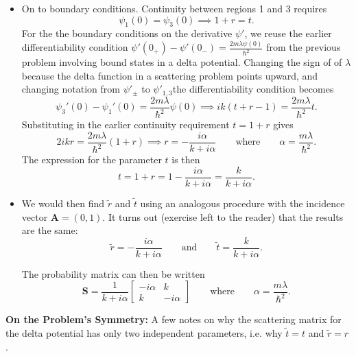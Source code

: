 \documentclass[11pt, a4paper]{article}
\newcommand{\eqtext}[1]{\qquad \text{#1} \qquad}
\renewcommand{\vec}[1]{\bm{#1}} %
\newcommand{\mat}[1]{\mathbf{#1}} %
\begin{document}
\begin{itemize}
	\item On to boundary conditions. Continuity between regions 1 and 3 requires
	\begin{equation*}
		\psi_{1}(0) = \psi_{3}(0) \implies 1 + r = t.
	\end{equation*} 
	For the the boundary conditions on the derivative $ \psi' $, we reuse the earlier differentiability condition $ \psi'(0_{+}) - \psi'(0_{-}) = \frac{2m\lambda\psi(0)}{\hbar^{2}} $ from the previous problem involving bound states in a delta potential. Changing the sign of of $ \lambda $ because the delta function in a scattering problem points upward, and changing notation from $ \psi'_{\pm} $ to $ \psi'_{1,3} $the differentiability condition becomes
	\begin{equation*}
		\psi_{3}'(0) - \psi_{1}'(0) = \frac{2m\lambda}{\hbar^{2}} \psi(0) \implies ik(t + r -1) = \frac{2m\lambda}{\hbar^{2}} t.
	\end{equation*}
	Substituting in the earlier continuity requirement $ t = 1 + r $ gives
	\begin{equation*}
		2ikr = \frac{2m\lambda}{\hbar^{2}} (1 + r) \implies r = -\frac{i\alpha}{k + i\alpha} \eqtext{where} \alpha = \frac{m\lambda}{\hbar^{2}}.
	\end{equation*}
	The expression for the parameter $ t $ is then
	\begin{equation*}
		t = 1 + r = 1 - \frac{i\alpha}{k + i\alpha} = \frac{k}{k + i\alpha}.
	\end{equation*}
	
	\item We would then find $ \tilde{r} $ and $ \tilde{t} $ using an analogous procedure with the incidence vector $ \vec{A} = (0, 1) $. It turns out (exercise left to the reader) that the results are the same:
	\begin{equation*}
		\tilde{r} = -\frac{i\alpha}{k + i\alpha}  \eqtext{and} \tilde{t} = \frac{k}{k + i\alpha}.
	\end{equation*}
	
	The probability matrix can then be written
	\begin{equation*}
		\mat{S} = \frac{1}{k + i \alpha} 
		\begin{bmatrix}
			- i \alpha & k\\
			k & - i \alpha
		\end{bmatrix} 
		\eqtext{where}
		\alpha = \frac{m\lambda}{\hbar^{2}}.
	\end{equation*}
\end{itemize}
\textbf{On the Problem's Symmetry:} A few notes on why the scattering matrix for the delta potential has only two independent parameters, i.e. why $ \tilde{t} = t $ and $ \tilde{r} = r $.
\end{document}
